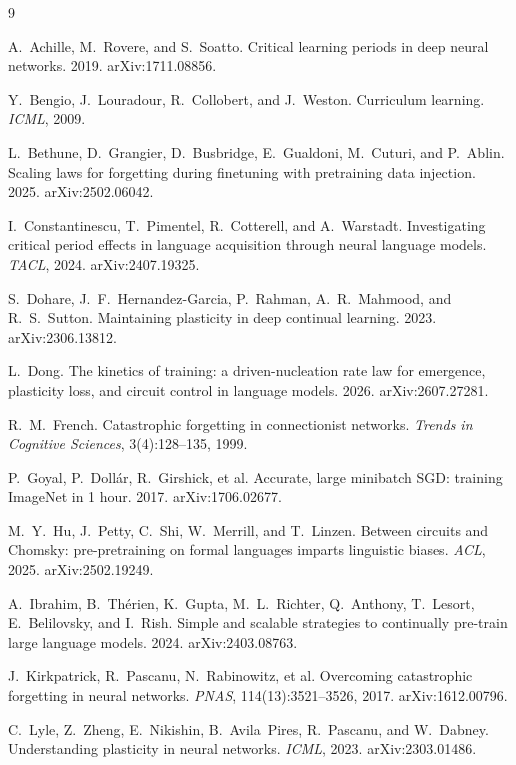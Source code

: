 \documentclass{article}
\begin{document}
\begin{thebibliography}{9}
\setlength{\itemsep}{1pt}\small

A.~Achille, M.~Rovere, and S.~Soatto. Critical learning periods in deep neural networks.
2019. arXiv:1711.08856.

Y.~Bengio, J.~Louradour, R.~Collobert, and J.~Weston. Curriculum learning. \emph{ICML}, 2009.

L.~Bethune, D.~Grangier, D.~Busbridge, E.~Gualdoni, M.~Cuturi, and P.~Ablin. Scaling laws
for forgetting during finetuning with pretraining data injection. 2025. arXiv:2502.06042.

I.~Constantinescu, T.~Pimentel, R.~Cotterell, and A.~Warstadt. Investigating critical period
effects in language acquisition through neural language models. \emph{TACL}, 2024.
arXiv:2407.19325.

S.~Dohare, J.~F.~Hernandez-Garcia, P.~Rahman, A.~R.~Mahmood, and R.~S.~Sutton. Maintaining
plasticity in deep continual learning. 2023. arXiv:2306.13812.

L.~Dong. The kinetics of training: a driven-nucleation rate law for emergence, plasticity
loss, and circuit control in language models. 2026. arXiv:2607.27281.

R.~M.~French. Catastrophic forgetting in connectionist networks. \emph{Trends in Cognitive
Sciences}, 3(4):128--135, 1999.

P.~Goyal, P.~Doll\'ar, R.~Girshick, et al. Accurate, large minibatch SGD: training ImageNet
in 1 hour. 2017. arXiv:1706.02677.

M.~Y.~Hu, J.~Petty, C.~Shi, W.~Merrill, and T.~Linzen. Between circuits and Chomsky:
pre-pretraining on formal languages imparts linguistic biases. \emph{ACL}, 2025.
arXiv:2502.19249.

A.~Ibrahim, B.~Th\'erien, K.~Gupta, M.~L.~Richter, Q.~Anthony, T.~Lesort, E.~Belilovsky,
and I.~Rish. Simple and scalable strategies to continually pre-train large language models.
2024. arXiv:2403.08763.

J.~Kirkpatrick, R.~Pascanu, N.~Rabinowitz, et al. Overcoming catastrophic forgetting in
neural networks. \emph{PNAS}, 114(13):3521--3526, 2017. arXiv:1612.00796.

C.~Lyle, Z.~Zheng, E.~Nikishin, B.~Avila~Pires, R.~Pascanu, and W.~Dabney. Understanding
plasticity in neural networks. \emph{ICML}, 2023. arXiv:2303.01486.


\end{thebibliography}
\end{document}

